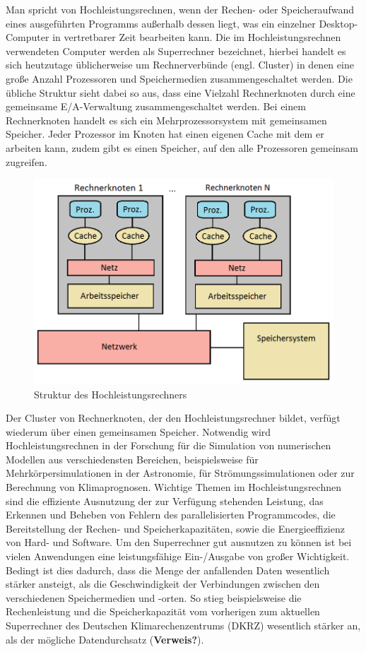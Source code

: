 \documentclass[
	12pt,
	a4paper,
	BCOR10mm,
	DIV14,
	listof=totoc,
	bibliography=totoc,
	headsepline
]{scrreprt}
\begin{document}
Man spricht von Hochleistungsrechnen, wenn der Rechen- oder Speicheraufwand eines ausgeführten Programms außerhalb dessen liegt, was ein einzelner Desktop-Computer in vertretbarer Zeit bearbeiten kann.
Die im Hochleistungsrechnen verwendeten Computer werden als Superrechner bezeichnet, hierbei handelt es sich heutzutage üblicherweise um Rechnerverbünde (engl. Cluster) in denen eine große Anzahl Prozessoren und Speichermedien zusammengeschaltet werden.
Die übliche Struktur sieht dabei so aus, dass eine Vielzahl Rechnerknoten durch eine gemeinsame E/A-Verwaltung zusammengeschaltet werden. Bei einem Rechnerknoten handelt es sich ein Mehrprozessorsystem mit gemeinsamen Speicher. Jeder Prozessor im Knoten hat einen eigenen Cache mit dem er arbeiten kann, zudem gibt es einen Speicher, auf den alle Prozessoren gemeinsam zugreifen. 
\begin{figure}
	\begin{center}
		\includegraphics[width=.43\textwidth]{Bilder/rechnerknoten.png}
	\end{center}
	\caption{Struktur des Hochleistungsrechners}
	\label{fig:rechnerknoten}
\end{figure}
Der Cluster von Rechnerknoten, der den Hochleistungsrechner bildet, verfügt wiederum über einen gemeinsamen Speicher.
Notwendig wird Hochleistungsrechnen in der Forschung für die Simulation von numerischen Modellen aus verschiedensten Bereichen, beispielsweise für Mehrkörpersimulationen in der Astronomie, für Strömungssimulationen oder zur Berechnung von Klimaprognosen.
Wichtige Themen im Hochleistungsrechnen sind die effiziente Ausnutzung der zur Verfügung stehenden Leistung, das Erkennen und Beheben von Fehlern des parallelisierten Programmcodes, die Bereitstellung der Rechen- und Speicherkapazitäten, sowie die Energieeffizienz von Hard- und Software.
Um den Superrechner gut ausnutzen zu können ist bei vielen Anwendungen eine leistungsfähige Ein-/Ausgabe von großer Wichtigkeit. Bedingt ist dies dadurch, dass die Menge der anfallenden Daten wesentlich stärker ansteigt, als die Geschwindigkeit der Verbindungen zwischen den verschiedenen Speichermedien und -orten. So stieg beispielsweise die Rechenleistung und die Speicherkapazität vom vorherigen zum aktuellen Superrechner des Deutschen Klimarechenzentrums (DKRZ) wesentlich stärker an, als der mögliche Datendurchsatz (\textbf{Verweis?}).
\end{document}
